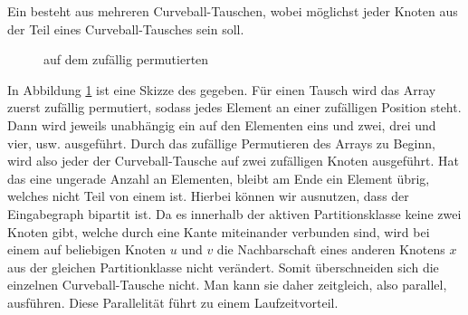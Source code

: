 Ein  besteht aus mehreren Curveball-Tauschen, wobei möglichst 
jeder Knoten aus der 
Teil eines Curveball-Tausches sein soll.
%
%
% 
\begin{figure}
\centering
  \caption{\gc{} auf dem zufällig permutierten \partvek}
  \label{fig:global_curveball_trade_vector}
  
\end{figure}
%
%
%
In Abbildung \ref{fig:global_curveball_trade_vector} ist eine Skizze des  gegeben.
Für einen \gc{} Tausch wird das Array zuerst zufällig permutiert, sodass jedes Element an einer zufälligen
Position steht.
Dann wird jeweils unabhängig ein \ct{} auf den Elementen eins und zwei, drei und vier, usw. ausgeführt.
Durch das zufällige Permutieren des Arrays zu Beginn, wird also jeder der Curveball-Tausche auf zwei zufälligen
Knoten ausgeführt. Hat das \partvek{} eine ungerade Anzahl an Elementen, bleibt am Ende ein Element übrig, 
welches nicht Teil von einem \ct{} ist. 
Hierbei können wir ausnutzen, dass der Eingabegraph bipartit ist. 
Da es innerhalb der aktiven Partitionsklasse 
keine zwei Knoten gibt, welche durch eine Kante miteinander verbunden sind, 
wird bei einem \ct{} auf beliebigen Knoten $u$ und $v$ 
die Nachbarschaft eines anderen Knotens $x$  aus der gleichen Partitionklasse nicht verändert. Somit
\glqq überschneiden\grqq{} sich die einzelnen Curveball-Tausche nicht. Man kann sie daher zeitgleich, 
also parallel, ausführen. Diese Parallelität führt zu einem Laufzeitvorteil.
\\

